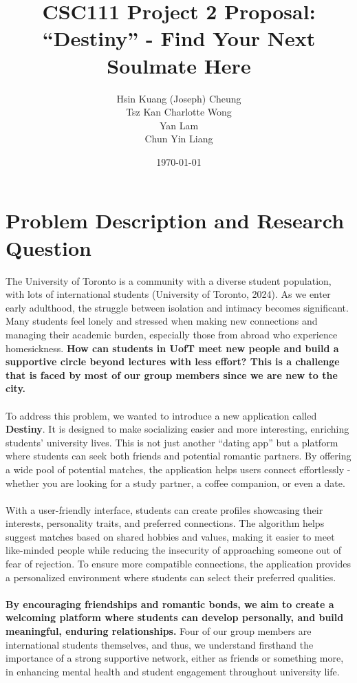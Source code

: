 \documentclass[fontsize=11pt]{article}
\title{CSC111 Project 2 Proposal: \\ \textbf{“Destiny” - Find Your Next Soulmate Here}}
\author{Hsin Kuang (Joseph) Cheung \\ Tsz Kan Charlotte Wong \\ Yan Lam \\ Chun Yin Liang}
\date{\today}
\begin{document}
\maketitle

\section*{Problem Description and Research Question}

The University of Toronto is a community with a diverse student population, with lots of international students (University of Toronto, 2024).
As we enter early adulthood, the struggle between isolation and intimacy becomes significant.
Many students feel lonely and stressed when making new connections and managing their academic burden, especially those from abroad who experience homesickness.
\textbf{How can students in UofT meet new people and build a supportive circle beyond lectures with less effort?
This is a challenge that is faced by most of our group members since we are new to the city.}
\\
\\
To address this problem, we wanted to introduce a new application called \textbf{Destiny}.
It is designed to make socializing easier and more interesting, enriching students’ university lives.
This is not just another “dating app” but a platform where students can seek both friends and potential romantic partners. By offering a wide pool of potential matches, the application helps users connect effortlessly - whether you are looking for a study partner, a coffee companion, or even a date.
\\
\\
With a user-friendly interface, students can create profiles showcasing their interests, personality traits, and preferred connections.
The algorithm helps suggest matches based on shared hobbies and values, making it easier to meet like-minded people while reducing the insecurity of approaching someone out of fear of rejection. To ensure more compatible connections, the application provides a personalized environment where students can select their preferred qualities.
\\
\\
\textbf{By encouraging friendships and romantic bonds, we aim to create a welcoming platform where students can develop personally, and build meaningful, enduring relationships.}
Four of our group members are international students themselves, and thus, we understand firsthand the importance of a strong supportive network, either as friends or something more, in enhancing mental health and student engagement throughout university life.
\end{document}
